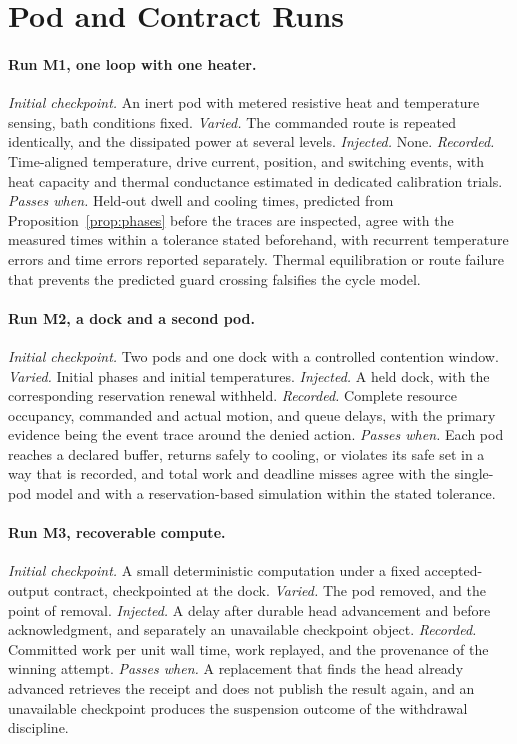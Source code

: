 \documentclass[11pt,openany]{book}
\theoremstyle{plain}
\theoremstyle{definition}
\theoremstyle{remark}
\begin{document}
\section{Pod and Contract Runs}

\paragraph{Run M1, one loop with one heater.} \emph{Initial checkpoint.} An inert pod with metered resistive heat and temperature sensing, bath conditions fixed. \emph{Varied.} The commanded route is repeated identically, and the dissipated power at several levels. \emph{Injected.} None. \emph{Recorded.} Time-aligned temperature, drive current, position, and switching events, with heat capacity and thermal conductance estimated in dedicated calibration trials. \emph{Passes when.} Held-out dwell and cooling times, predicted from Proposition~\ref{prop:phases} before the traces are inspected, agree with the measured times within a tolerance stated beforehand, with recurrent temperature errors and time errors reported separately. Thermal equilibration or route failure that prevents the predicted guard crossing falsifies the cycle model.

\paragraph{Run M2, a dock and a second pod.} \emph{Initial checkpoint.} Two pods and one dock with a controlled contention window. \emph{Varied.} Initial phases and initial temperatures. \emph{Injected.} A held dock, with the corresponding reservation renewal withheld. \emph{Recorded.} Complete resource occupancy, commanded and actual motion, and queue delays, with the primary evidence being the event trace around the denied action. \emph{Passes when.} Each pod reaches a declared buffer, returns safely to cooling, or violates its safe set in a way that is recorded, and total work and deadline misses agree with the single-pod model and with a reservation-based simulation within the stated tolerance.

\paragraph{Run M3, recoverable compute.} \emph{Initial checkpoint.} A small deterministic computation under a fixed accepted-output contract, checkpointed at the dock. \emph{Varied.} The pod removed, and the point of removal. \emph{Injected.} A delay after durable head advancement and before acknowledgment, and separately an unavailable checkpoint object. \emph{Recorded.} Committed work per unit wall time, work replayed, and the provenance of the winning attempt. \emph{Passes when.} A replacement that finds the head already advanced retrieves the receipt and does not publish the result again, and an unavailable checkpoint produces the suspension outcome of the withdrawal discipline.
\end{document}
